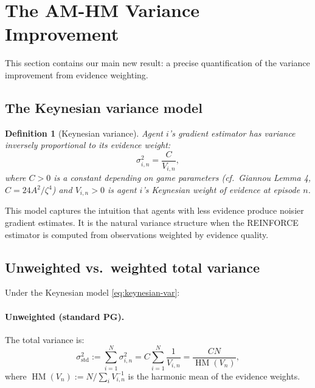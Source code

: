 \documentclass[11pt,a4paper]{article}
\newtheorem{definition}[theorem]{Definition}
\DeclareMathOperator{\HM}{HM}
\begin{document}
\section{The AM-HM Variance Improvement}
\label{sec:am-hm}

This section contains our main new result: a precise quantification of the variance improvement from evidence weighting.

\subsection{The Keynesian variance model}

\begin{definition}[Keynesian variance]
\label{def:keynesian-variance}
Agent $i$'s gradient estimator has variance inversely proportional to its evidence weight:
\begin{equation}
\label{eq:keynesian-var}
    \sigma_{i,n}^2 = \frac{C}{V_{i,n}},
\end{equation}
where $C > 0$ is a constant depending on game parameters (cf.\ Giannou Lemma 4, $C = 24A^2/\zeta^4$) and $V_{i,n} > 0$ is agent $i$'s Keynesian weight of evidence at episode $n$.
\end{definition}

This model captures the intuition that agents with less evidence produce noisier gradient estimates. It is the natural variance structure when the REINFORCE estimator is computed from observations weighted by evidence quality.

\subsection{Unweighted vs.\ weighted total variance}

Under the Keynesian model \eqref{eq:keynesian-var}:

\paragraph{Unweighted (standard PG).} The total variance is:
\begin{equation}
\label{eq:var-unweighted}
    \sigma_{\text{std}}^2 := \sum_{i=1}^N \sigma_{i,n}^2 = C \sum_{i=1}^N \frac{1}{V_{i,n}} = \frac{CN}{\HM(V_n)},
\end{equation}
where $\HM(V_n) := N / \sum_i V_{i,n}^{-1}$ is the harmonic mean of the evidence weights.
\end{document}
